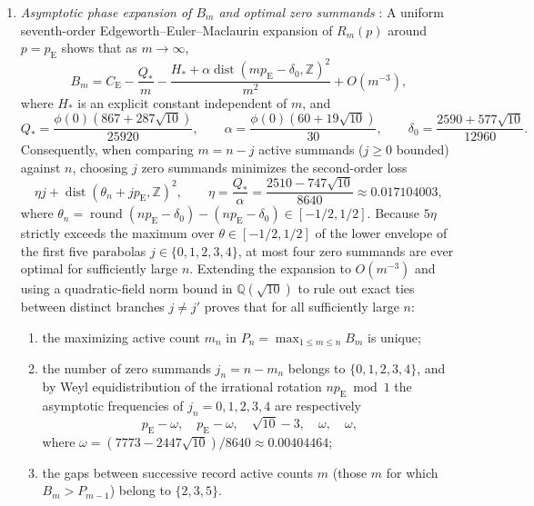 \documentclass[11pt]{article}
\numberwithin{equation}{section}
\theoremstyle{definition}
\theoremstyle{remark}
\DeclareMathOperator{\dist}{dist}
\newcommand{\Z}{\mathbb Z}
\newcommand{\ce}{C_{\mathrm E}}
\newcommand{\pe}{p_{\mathrm E}}
\newcommand{\phz}{\phi(0)}
\begin{document}
\begin{enumerate}[label=(\arabic*),leftmargin=2em]
\item \emph{Asymptotic phase expansion of $B_m$ and optimal zero summands}
\citep[Theorem~4.1]{BellBernoulli2026}: A uniform seventh-order
Edgeworth--Euler--Maclaurin expansion of $R_m(p)$ around $p=\pe$ shows that
as $m\to\infty$,
\begin{equation}\label{eq:bm-phase-expansion}
 B_m=\ce-\frac{Q_*}{m}
 -\frac{H_*+\alpha\dist(m\pe-\delta_0,\Z)^2}{m^2}+O(m^{-3}),
\end{equation}
where $H_*$ is an explicit constant independent of $m$, and
\begin{equation}\label{eq:phase-constants}
 Q_*=\frac{\phz(867+287\sqrt{10})}{25920},\qquad
 \alpha=\frac{\phz(60+19\sqrt{10})}{30},\qquad
 \delta_0=\frac{2590+577\sqrt{10}}{12960}.
\end{equation}
Consequently, when comparing $m=n-j$ active summands ($j\ge0$ bounded)
against $n$, choosing $j$ zero summands minimizes the second-order loss
\begin{equation}\label{eq:parabola-envelope}
 \eta j+\dist(\theta_n+j\pe,\Z)^2,\qquad
 \eta=\frac{Q_*}{\alpha}=\frac{2510-747\sqrt{10}}{8640}\approx0.017104003,
\end{equation}
where $\theta_n=\operatorname{round}(n\pe-\delta_0)-(n\pe-\delta_0)\in[-1/2,1/2]$.
Because $5\eta$ strictly exceeds the maximum over $\theta\in[-1/2,1/2]$ of the
lower envelope of the first five parabolas $j\in\{0,1,2,3,4\}$, at most four
zero summands are ever optimal for sufficiently large $n$. Extending the
expansion to $O(m^{-3})$ and using a quadratic-field norm bound in
$\mathbb Q(\sqrt{10})$ to rule out exact ties between distinct branches
$j\ne j'$ proves that for all sufficiently large $n$:
\begin{enumerate}[label=(\alph*),leftmargin=2em]
\item the maximizing active count $m_n$ in $P_n=\max_{1\le m\le n}B_m$ is
unique;
\item the number of zero summands $j_n=n-m_n$ belongs to $\{0,1,2,3,4\}$, and
by Weyl equidistribution of the irrational rotation $n\pe\bmod1$ the
asymptotic frequencies of $j_n=0,1,2,3,4$ are respectively
\begin{equation}\label{eq:padding-frequencies}
 \pe-\omega,\quad
 \pe-\omega,\quad
 \sqrt{10}-3,\quad
 \omega,\quad
 \omega,
\end{equation}
where $\omega=(7773-2447\sqrt{10})/8640\approx0.00404464$;
\item the gaps between successive record active counts $m$ (those $m$ for
which $B_m>P_{m-1}$) belong to $\{2,3,5\}$.
\end{enumerate}
\end{enumerate}
\end{document}
